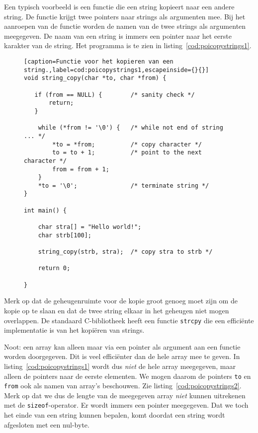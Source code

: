Een typisch voorbeeld is een functie die een string kopieert naar een andere string. De functie krijgt twee pointers naar strings als argumenten mee. Bij het aanroepen van de functie worden de namen van de twee strings als argumenten meegegeven. De naam van een string is immers een pointer naar het eerste karakter van de string. Het programma is te zien in listing~\ref{cod:poicopystrings1}.

\begin{figure}[!ht]
\begin{lstlisting}[caption=Functie voor het kopieren van een string.,label=cod:poicopystrings1,escapeinside={}{}]
void string_copy(char *to, char *from) {

   if (from == NULL) {        /* sanity check */
       return;
   }

    while (*from != '\0') {   /* while not end of string ... */
        *to = *from;          /* copy character */
        to = to + 1;          /* point to the next character */
        from = from + 1;
    }
    *to = '\0';               /* terminate string */
}

int main() {

    char stra[] = "Hello world!";
    char strb[100];

    string_copy(strb, stra);  /* copy stra to strb */

	return 0;

}
\end{lstlisting}
\end{figure}

Merk op dat de geheugenruimte voor de kopie groot genoeg moet zijn om de kopie op te slaan en dat de twee string elkaar in het geheugen niet mogen overlappen. De standaard C-bibliotheek heeft een functie \texttt{strcpy} die een efficiënte implementatie is van het kopiëren van strings.

Noot: een array kan alleen maar via een pointer als argument aan een functie worden doorgegeven. Dit is veel efficiënter dan de hele array mee te geven. In listing~\ref{cod:poicopystrings1} wordt dus \textsl{niet} de hele array meegegeven, maar alleen de pointers naar de eerste elementen. We mogen daarom de pointers \texttt{to} en \texttt{from} ook als namen van array's beschouwen.  Zie listing~\ref{cod:poicopystrings2}. Merk op dat we dus de lengte van de meegegeven array \textsl{niet} kunnen uitrekenen met de \texttt{sizeof}-operator. Er wordt immers een pointer meegegeven. Dat we toch het einde van een string kunnen bepalen, komt doordat een string wordt afgesloten met een nul-byte.

